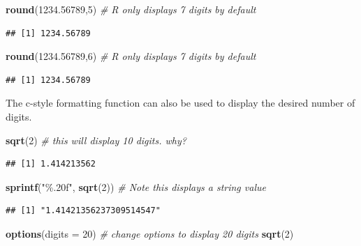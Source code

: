 \documentclass[
]{book}
\newenvironment{Shaded}{\begin{snugshade}}{\end{snugshade}}
\newcommand{\AttributeTok}[1]{\textcolor[rgb]{0.13,0.29,0.53}{#1}}
\newcommand{\CommentTok}[1]{\textcolor[rgb]{0.56,0.35,0.01}{\textit{#1}}}
\newcommand{\DecValTok}[1]{\textcolor[rgb]{0.00,0.00,0.81}{#1}}
\newcommand{\FloatTok}[1]{\textcolor[rgb]{0.00,0.00,0.81}{#1}}
\newcommand{\FunctionTok}[1]{\textcolor[rgb]{0.13,0.29,0.53}{\textbf{#1}}}
\newcommand{\NormalTok}[1]{#1}
\newcommand{\StringTok}[1]{\textcolor[rgb]{0.31,0.60,0.02}{#1}}
\begin{document}
\begin{Shaded}
\begin{Highlighting}[]
\FunctionTok{round}\NormalTok{(}\FloatTok{1234.56789}\NormalTok{,}\DecValTok{5}\NormalTok{)    }\CommentTok{\# R only displays 7 digits by default}
\end{Highlighting}
\end{Shaded}

\begin{verbatim}
## [1] 1234.56789
\end{verbatim}

\begin{Shaded}
\begin{Highlighting}[]
\FunctionTok{round}\NormalTok{(}\FloatTok{1234.56789}\NormalTok{,}\DecValTok{6}\NormalTok{)    }\CommentTok{\# R only displays 7 digits by default}
\end{Highlighting}
\end{Shaded}

\begin{verbatim}
## [1] 1234.56789
\end{verbatim}

The c-style formatting function can also be used to display the desired number of digits.

\begin{Shaded}
\begin{Highlighting}[]
\FunctionTok{sqrt}\NormalTok{(}\DecValTok{2}\NormalTok{)                     }\CommentTok{\# this will display 10 digits. why?}
\end{Highlighting}
\end{Shaded}

\begin{verbatim}
## [1] 1.414213562
\end{verbatim}

\begin{Shaded}
\begin{Highlighting}[]
\FunctionTok{sprintf}\NormalTok{(}\StringTok{"\%.20f"}\NormalTok{, }\FunctionTok{sqrt}\NormalTok{(}\DecValTok{2}\NormalTok{))   }\CommentTok{\# Note this displays a string value}
\end{Highlighting}
\end{Shaded}

\begin{verbatim}
## [1] "1.41421356237309514547"
\end{verbatim}

\begin{Shaded}
\begin{Highlighting}[]
\FunctionTok{options}\NormalTok{(}\AttributeTok{digits =} \DecValTok{20}\NormalTok{)        }\CommentTok{\# change options to display 20 digits}
\FunctionTok{sqrt}\NormalTok{(}\DecValTok{2}\NormalTok{)}
\end{Highlighting}
\end{Shaded}
\end{document}
